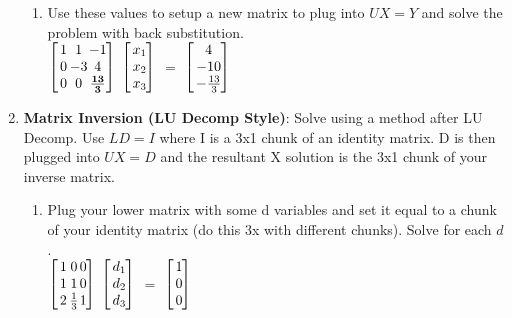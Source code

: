 \documentclass[fontsize=5pt]{scrartcl}
\makeatletter
\newenvironment{tmatrix3}%
{ 
  $\left[\hspace{-3.5pt}\begin{array}{c@{\hspace{1pt}}@{\hspace{1pt}}c@{\hspace{1pt}}c@{\hspace{3pt}}}
}%
{
   \end{array}\hspace{-3.5pt}\right]$
}
\newenvironment{tmatrix1}%
{ 
  $\left[\hspace{-3.5pt}\begin{array}{c@{\hspace{3pt}}}
}%
{
   \end{array}\hspace{-3.5pt}\right]$
}
\makeatother
\begin{document}
\begin{multicols}{3}
\begin{enumerate}
\begin{enumerate}
            \item Use these values to setup a new matrix to plug into $UX=Y$ and solve the problem with back substitution.\\
              \begin{tmatrix3}
                1 & 1  & -1 \\
                0 & -3 & 4  \\
                0 & 0  & \mathbf{\frac{13}{3}} 
              \end{tmatrix3}%
              \begin{tmatrix1}
                x_1\\
                x_2\\
                x_3\\
              \end{tmatrix1}%
              $=$%
              \begin{tmatrix1}
                4\\
                 -10\\
                 -\frac{13}{3}\\
              \end{tmatrix1}\\
          \end{enumerate}
          
          \item \textbf{Matrix Inversion (LU Decomp Style)}: Solve using a method after LU Decomp. Use $LD=I$ where I is a 3x1 
          chunk of an identity matrix. D is then plugged into $UX=D$ and the resultant X solution is the 3x1 chunk of your inverse matrix.
          
          \begin{enumerate}
          
          \item Plug your lower matrix with some d variables and set it equal to a chunk of your identity matrix (do this 3x with different
                chunks). Solve for each $d$. \\
            \begin{tmatrix3}
              1 & 0 & 0 \\
              1 & 1 & 0 \\ 
              2 & \frac{1}{3} & 1 \\
            \end{tmatrix3}%
            \begin{tmatrix1}
              d_1 \\
              d_2 \\ 
              d_3 \\
            \end{tmatrix1}$=$%
            \begin{tmatrix1}
              1 \\
              0 \\
              0
            \end{tmatrix1}
          

\end{enumerate}
\end{enumerate}
\end{multicols}
\end{document}
